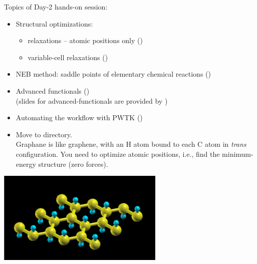 \documentclass[landscape]{foils}
\begin{document}
\blue

Topics of Day-2 hands-on session:
\begin{itemize}
\item Structural optimizations:
  \begin{itemize}
  \item relaxations -- atomic positions only ()
  \item variable-cell relaxations ()
  \end{itemize}
\item NEB method: saddle points of elementary chemical
  reactions ()
\item Advanced functionals ()\\
  (slides for advanced-functionals are provided by )
\item Automating the workflow with PWTK
  ()
\end{itemize}

\rightheader{}

\parbox{17cm}{
  \begin{itemize}
  \item Move to  directory.\\[0.5em]
    Graphane is like graphene, with an H atom bound to each C atom in
    {\em trans} configuration. You need to optimize atomic positions,
    i.e., find the minimum-energy structure (zero forces).
  \end{itemize}
} \hskip 1cm
\parbox{8cm}{ \includegraphics[width=8cm]{figs/graphane.pdf}}
\end{document}

